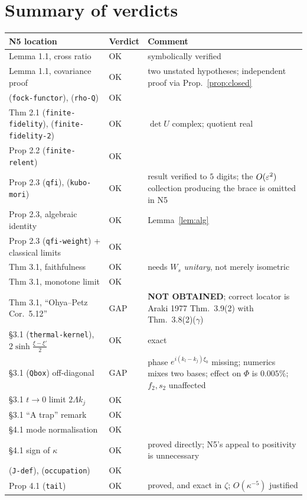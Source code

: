 \documentclass[11pt]{article}
\begin{document}
\section{Summary of verdicts}\label{sec:summary}
\renewcommand{\arraystretch}{1.15}
\begin{longtable}{@{}p{}p{}p{}@{}}
\toprule
\textbf{N5 location} & \textbf{Verdict} & \textbf{Comment}\\\midrule
\endhead
Lemma 1.1, cross ratio & OK & symbolically verified\\
Lemma 1.1, covariance proof & OK & two unstated hypotheses; independent proof via
Prop.~\ref{prop:closed}\\
(\texttt{fock-functor}), (\texttt{rho-Q}) & OK & \\
Thm 2.1 (\texttt{finite-fidelity}), (\texttt{finite-fidelity-2}) & OK & $\det U$ complex; quotient real\\
Prop 2.2 (\texttt{finite-relent}) & OK & \\
Prop 2.3 (\texttt{qfi}), (\texttt{kubo-mori}) & OK & result verified to $5$ digits; the
$O(\varepsilon^2)$ collection producing the brace is omitted in N5\\
Prop 2.3, algebraic identity & OK & Lemma~\ref{lem:alg}\\
Prop 2.3 (\texttt{qfi-weight}) + classical limits & OK & \\
Thm 3.1, faithfulness & OK & needs $W_s$ \emph{unitary}, not merely isometric\\
Thm 3.1, monotone limit & OK & \\
Thm 3.1, ``Ohya--Petz Cor.\ 5.12'' & GAP & \textbf{NOT OBTAINED}; correct locator is Araki 1977
Thm.\ 3.9(2) with Thm.\ 3.8(2)($\gamma$)\\
\S3.1 (\texttt{thermal-kernel}), $2\sinh\frac{\xi-\xi'}2$ & OK & exact\\
\S3.1 (\texttt{Qbox}) off-diagonal & GAP & phase $e^{i(k_l-k_j)\xi_0}$ missing; numerics mixes two
bases; effect on $\Phi$ is $0.005\%$; $f_2,s_2$ unaffected\\
\S3.1 $t\to0$ limit $2\Lambda k_j$ & OK & \\
\S3.1 ``A trap'' remark & OK & \\
\S4.1 mode normalisation & OK & \\
\S4.1 sign of $\kappa$ & OK & proved directly; N5's appeal to positivity is unnecessary\\
(\texttt{J-def}), (\texttt{occupation}) & OK & \\
Prop 4.1 (\texttt{tail}) & OK & proved, and exact in $\zeta$; $O(\kappa^{-5})$ justified\\

\end{longtable}
\end{document}
